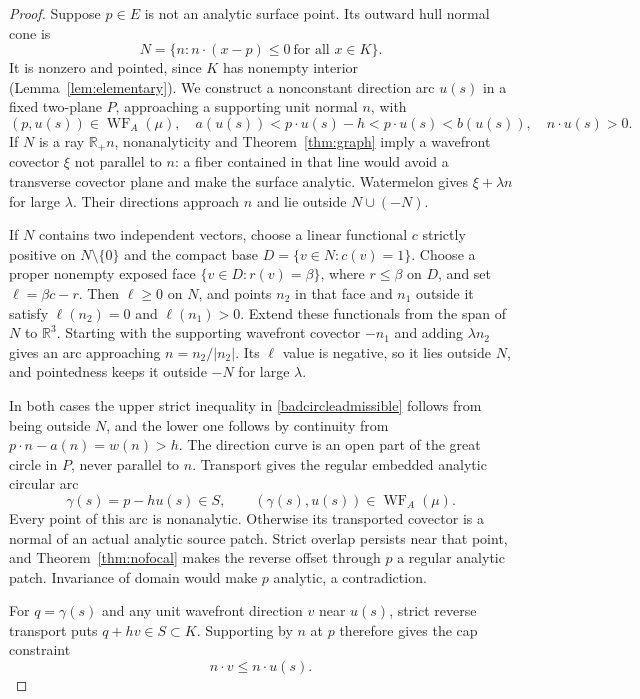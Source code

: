 \documentclass[11pt]{article}
\newcommand{\R}{\mathbb R}
\newcommand{\WF}{\operatorname{WF}_{A}}
\begin{document}
\begin{proof}
Suppose $p\in E$ is not an analytic surface point. Its outward hull normal cone is
\[
 N=\{n:n\cdot(x-p)\le0\ \text{for all }x\in K\}.
\]
It is nonzero and pointed, since $K$ has nonempty interior (Lemma~\ref{lem:elementary}). We construct a nonconstant direction arc $u(s)$ in a fixed two-plane $P$, approaching a supporting unit normal $n$, with
\begin{equation}\label{badcircleadmissible}
 (p,u(s))\in\WF(\mu),\quad
 a(u(s))<p\cdot u(s)-h<p\cdot u(s)<b(u(s)),\quad n\cdot u(s)>0.
\end{equation}
If $N$ is a ray $\R_+n$, nonanalyticity and Theorem~\ref{thm:graph} imply a wavefront covector $\xi$ not parallel to $n$: a fiber contained in that line would avoid a transverse covector plane and make the surface analytic. Watermelon gives $\xi+\lambda n$ for large $\lambda$. Their directions approach $n$ and lie outside $N\cup(-N)$.

If $N$ contains two independent vectors, choose a linear functional $c$ strictly positive on $N\setminus\{0\}$ and the compact base $D=\{v\in N:c(v)=1\}$. Choose a proper nonempty exposed face $\{v\in D:r(v)=\beta\}$, where $r\le\beta$ on $D$, and set $\ell=\beta c-r$. Then $\ell\ge0$ on $N$, and points $n_2$ in that face and $n_1$ outside it satisfy $\ell(n_2)=0$ and $\ell(n_1)>0$. Extend these functionals from the span of $N$ to $\R^3$. Starting with the supporting wavefront covector $-n_1$ and adding $\lambda n_2$ gives an arc approaching $n=n_2/|n_2|$. Its $\ell$ value is negative, so it lies outside $N$, and pointedness keeps it outside $-N$ for large $\lambda$.

In both cases the upper strict inequality in \eqref{badcircleadmissible} follows from being outside $N$, and the lower one follows by continuity from $p\cdot n-a(n)=w(n)>h$. The direction curve is an open part of the great circle in $P$, never parallel to $n$. Transport gives the regular embedded analytic circular arc
\begin{equation}\label{forcedcircle}
 \gamma(s)=p-hu(s)\in S,\qquad (\gamma(s),u(s))\in\WF(\mu).
\end{equation}
Every point of this arc is nonanalytic. Otherwise its transported covector is a normal of an actual analytic source patch. Strict overlap persists near that point, and Theorem~\ref{thm:nofocal} makes the reverse offset through $p$ a regular analytic patch. Invariance of domain would make $p$ analytic, a contradiction.

For $q=\gamma(s)$ and any unit wavefront direction $v$ near $u(s)$, strict reverse transport puts $q+hv\in S\subset K$. Supporting by $n$ at $p$ therefore gives the cap constraint
\begin{equation}\label{angularcap}
 n\cdot v\le n\cdot u(s).
\end{equation}


\end{proof}
\end{document}
